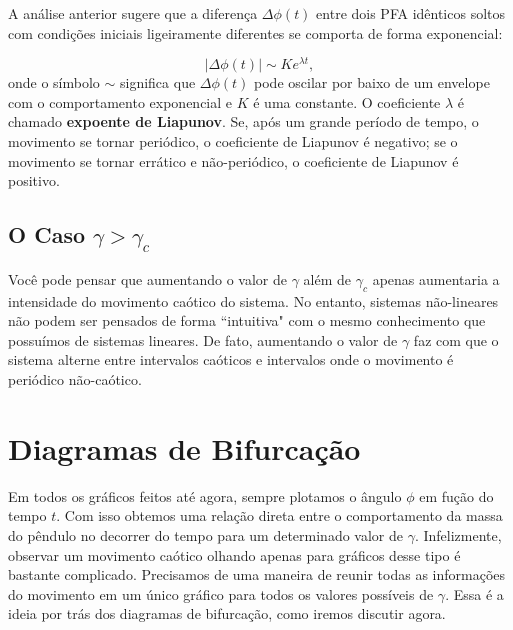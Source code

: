 \documentclass{article}
\begin{document}
A análise anterior sugere que a diferença $\Delta\phi(t)$ entre dois PFA idênticos soltos com condições iniciais ligeiramente diferentes se comporta de forma exponencial:

\begin{equation}
    |\Delta\phi(t)| \sim Ke^{\lambda t},
\end{equation}
onde o símbolo $\sim$ significa que $\Delta\phi(t)$ pode oscilar por baixo de um envelope com o comportamento exponencial e $K$ é uma constante. O coeficiente $\lambda$ é chamado \textbf{expoente de Liapunov}. Se, após um grande período de tempo, o movimento se tornar periódico, o coeficiente de Liapunov é negativo; se o movimento se tornar errático e não-periódico, o coeficiente de Liapunov é positivo.


\subsection{O Caso $\gamma > \gamma_c$}

Você pode pensar que aumentando o valor de $\gamma$ além de $\gamma_c$ apenas aumentaria a intensidade do movimento caótico do sistema. No entanto, sistemas não-lineares não podem ser pensados de forma ``intuitiva" com o mesmo conhecimento que possuímos de sistemas lineares. De fato, aumentando o valor de $\gamma$ faz com que o sistema alterne entre intervalos caóticos e intervalos onde o movimento é periódico não-caótico. 



\section{Diagramas de Bifurcação}

Em todos os gráficos feitos até agora, sempre plotamos o ângulo $\phi$ em fução do tempo $t$. Com isso obtemos uma relação direta entre o comportamento da massa do pêndulo no decorrer do tempo para um determinado valor de $\gamma$. Infelizmente, observar um movimento caótico olhando apenas para gráficos desse tipo é bastante complicado. Precisamos de uma maneira de reunir todas as informações do movimento em um único gráfico para todos os valores possíveis de $\gamma$. Essa é a ideia por trás dos diagramas de bifurcação, como iremos discutir agora.
\end{document}
